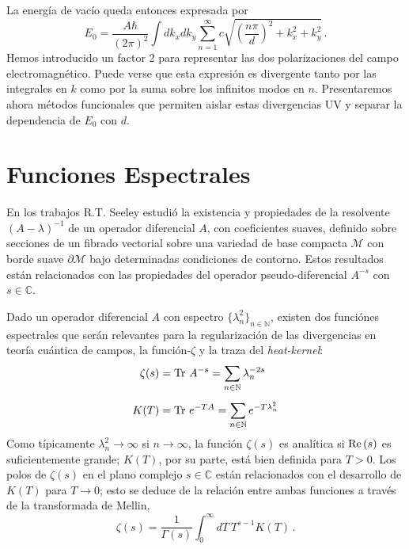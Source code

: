 La energía de vacío queda entonces expresada por
\begin{equation}
E _0 = \frac{A \hbar }{(2 \pi) ^2} \int dk _x dk _y 
\sum _{n=1} ^{\infty} 
c
\sqrt{
		\left( \frac{n \pi}{d} \right) ^2 + k _x ^2 + k _y ^2
		}\,.
\end{equation}
Hemos introducido un factor 2 para representar las dos polarizaciones del campo electromagnético. Puede verse que esta expresión es divergente tanto por las integrales en $k$ como por la suma sobre los infinitos modos en $n$. Presentaremos ahora métodos funcionales que permiten aislar estas divergencias UV y separar la dependencia de $E_0$ con $d$.

\section{Funciones Espectrales}

En los trabajos \cite{Seeley:1967ea,10.2307/2373309,10.2307/2373312} R.T. Seeley estudió la existencia y propiedades de la resolvente $(A - \lambda) ^{-1}$ de un operador diferencial $A$, con coeficientes suaves, definido sobre secciones de un fibrado vectorial sobre una variedad de base compacta $\mathcal{M}$ con borde suave $\partial \mathcal{M}$ bajo determinadas condiciones de contorno. Estos resultados están relacionados con las propiedades del operador pseudo-diferencial $A ^{-s}$ con $s \in \mathbb{C}$.



Dado un operador diferencial $A$ con espectro $\{ \lambda ^2 _n \} _{n \in \mathbb N}$, existen dos funciónes espectrales que serán relevantes para la regularización de las divergencias en teoría cuántica de campos, la función-$\zeta$ y la traza del {\it heat-kernel}:
\begin{align}
\zeta  (s) &= {\rm Tr}\ A ^{-s} = \sum \limits_{n \in \mathbb N}   \lambda _n ^{-2s} \label{funcion.zeta}\\[2mm]
K (T) &=  {\rm Tr} \ e ^{-T A} = \sum \limits_{n \in \mathbb N} e ^{-T \lambda ^2 _{n} }
\end{align}
Como típicamente $\lambda ^2 _n\to \infty$ si $n\to \infty$, la función $\zeta  (s) $ es analítica si ${\rm Re}\,(s)$ es suficientemente grande; $K(T)$, por su parte, está bien definida para $T>0$. Los polos de $\zeta(s)$ en el plano complejo $s\in\mathbb C$ están relacionados con el desarrollo de $K(T)$ para $T\to 0$; esto se deduce de la relación entre ambas funciones a través de la transformada de Mellin,
\begin{equation}
\zeta (s) = \frac{1}{\Gamma (s) } 
\int _0 ^{\infty} dT \
T^{s-1} K(T) \,.
\label{eq.mellin}
\end{equation}

